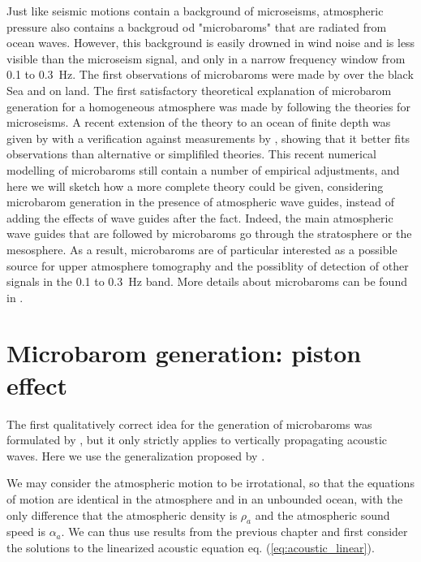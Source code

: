 Just like seismic motions contain a background of microseisms, atmospheric pressure also contains a backgroud od "microbaroms" that are radiated from ocean waves. However, this background is easily drowned in wind noise and is less visible than the microseism signal, and only in a narrow frequency window from 0.1 to 0.3~Hz. The first observations of microbaroms were made by \cite{Shuleikin1935} over the black Sea and \cite{Benioff&Gutemberg1939} on land. The first satisfactory theoretical explanation of microbarom generation for a homogeneous atmosphere was made by \cite{Brekhovskikh&al.1973} following the theories for microseisms. A recent extension of the theory to an ocean of finite depth was given by \cite{DeCarlo&al.2020} with a verification against measurements by \cite{DeCarlo&al.2021}, showing that it better fits observations than alternative or simplifiled theories.  This recent numerical modelling of microbaroms still contain a number of empirical adjustments, and here we will sketch how a more complete theory could be given, considering microbarom generation in the presence of atmospheric wave guides, instead of adding the effects of wave guides after the fact. Indeed, the main atmospheric wave guides that are followed by microbaroms go through the stratosphere or the mesosphere. As a result, microbaroms are of particular interested as a possible source for upper atmosphere tomography \citep{Donn&Rind1971,Smets&Evers2014} and the possiblity of detection of other signals in the 0.1 to 0.3~Hz band. More details about microbaroms can be found in \cite{DeCarlo2020}.

\section{Microbarom generation: piston effect}
The first qualitatively correct idea for the generation of microbaroms was formulated by \cite{Posmentier1967}, but it only strictly applies to vertically propagating acoustic waves. Here we use the generalization proposed by \cite{Ardhuin&Herbers2013}. 

We may consider the atmospheric motion to be irrotational, so that the equations of motion 
are identical in the atmosphere and in an unbounded ocean, with the only difference that 
 the atmospheric density is $\rho_a$ and the atmospheric sound speed is $\alpha_a$. We can thus use results from the previous chapter and first consider the solutions to the linearized acoustic equation eq. (\ref{eq:acoustic_linear}). 
 
